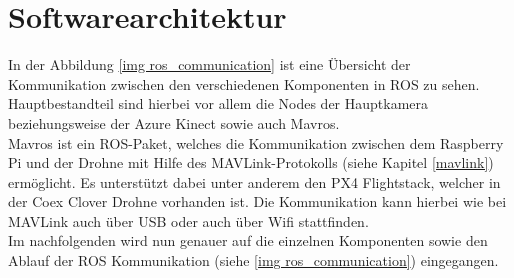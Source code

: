 \section{Softwarearchitektur} \label{softwarearchitektur:section}

In der Abbildung \ref{img ros_communication} ist eine Übersicht der Kommunikation zwischen den verschiedenen Komponenten in \ac{ROS} zu sehen. \\
Hauptbestandteil sind hierbei vor allem die Nodes der Hauptkamera beziehungsweise der Azure Kinect sowie auch Mavros. \\
Mavros ist ein ROS-Paket, welches die Kommunikation zwischen dem Raspberry Pi und der Drohne mit Hilfe des MAVLink-Protokolls (siehe Kapitel \ref{mavlink}) ermöglicht. Es unterstützt dabei unter anderem den PX4 Flightstack, welcher in der Coex Clover Drohne vorhanden ist. Die Kommunikation kann hierbei wie bei MAVLink auch über \ac{USB} oder auch über Wifi stattfinden. \cite[vgl.][]{mavros}\\
Im nachfolgenden wird nun genauer auf die einzelnen Komponenten sowie den Ablauf der ROS Kommunikation (siehe \ref{img ros_communication}) eingegangen. \\

